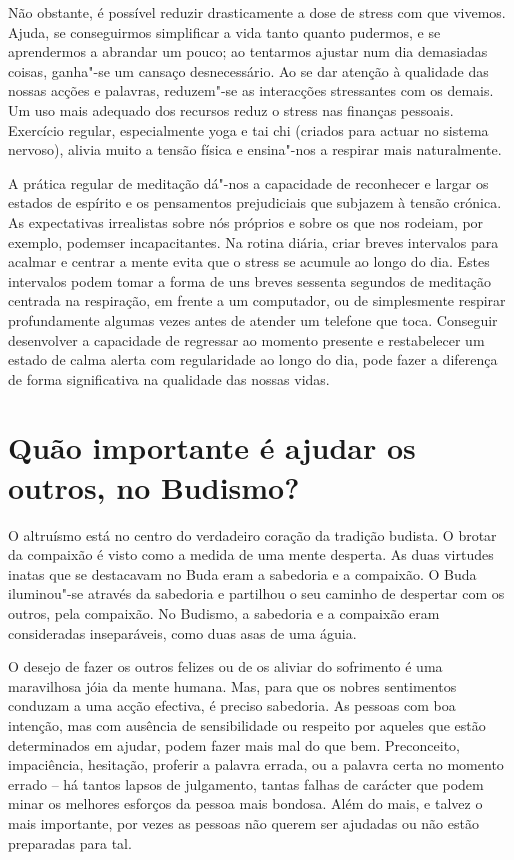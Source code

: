 Não obstante, é possível reduzir drasticamente a dose de stress com que
vivemos. Ajuda, se conseguirmos simplificar a vida tanto quanto
pudermos, e se aprendermos a abrandar um pouco; ao tentarmos ajustar num
dia demasiadas coisas, ganha"-se um cansaço desnecessário. Ao se dar
atenção à qualidade das nossas acções e palavras, reduzem"-se as
interacções stressantes com os demais. Um uso mais adequado dos recursos
reduz o stress nas finanças pessoais. Exercício regular, especialmente
yoga e tai chi (criados para actuar no sistema nervoso), alivia muito a
tensão física e ensina"-nos a respirar mais naturalmente.

A prática regular de meditação dá"-nos a capacidade de reconhecer e
largar os estados de espírito e os pensamentos prejudiciais que subjazem
à tensão crónica. As expectativas irrealistas sobre nós próprios e sobre
os que nos rodeiam, por exemplo, podemser incapacitantes. Na rotina
diária, criar breves intervalos para acalmar e centrar a mente evita que
o stress se acumule ao longo do dia. Estes intervalos podem tomar a
forma de uns breves sessenta segundos de meditação centrada na
respiração, em frente a um computador, ou de simplesmente respirar
profundamente algumas vezes antes de atender um telefone que toca.
Conseguir desenvolver a capacidade de regressar ao momento presente e
restabelecer um estado de calma alerta com regularidade ao longo do dia,
pode fazer a diferença de forma significativa na qualidade das nossas
vidas.

\section{Quão importante é ajudar os outros, no Budismo?}

O altruísmo está no centro do verdadeiro coração da tradição budista. O
brotar da compaixão é visto como a medida de uma mente desperta. As duas
virtudes inatas que se destacavam no Buda eram a sabedoria e a
compaixão. O Buda iluminou"-se através da sabedoria e partilhou o seu
caminho de despertar com os outros, pela compaixão. No Budismo, a
sabedoria e a compaixão eram consideradas inseparáveis, como duas asas
de uma águia.

O desejo de fazer os outros felizes ou de os aliviar do sofrimento é uma
maravilhosa jóia da mente humana. Mas, para que os nobres sentimentos
conduzam a uma acção efectiva, é preciso sabedoria. As pessoas com boa
intenção, mas com ausência de sensibilidade ou respeito por aqueles que
estão determinados em ajudar, podem fazer mais mal do que bem.
Preconceito, impaciência, hesitação, proferir a palavra errada, ou a
palavra certa no momento errado -- há tantos lapsos de julgamento,
tantas falhas de carácter que podem minar os melhores esforços da pessoa
mais bondosa. Além do mais, e talvez o mais importante, por vezes as
pessoas não querem ser ajudadas ou não estão preparadas para tal.

